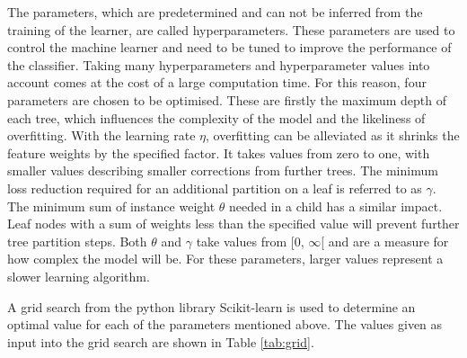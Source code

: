 The parameters, which are predetermined and can not be inferred from the training of the learner, are called hyperparameters. These parameters are used
to control the machine learner and need to be tuned to improve the performance of the classifier.
Taking many hyperparameters and hyperparameter values into account comes at the
cost of a large computation time. For this reason, four parameters are chosen to be optimised. These are firstly the maximum depth of each tree, which influences the
complexity of the model and the likeliness of overfitting. With the learning rate $\eta$, overfitting can be alleviated as it shrinks the feature weights
by the specified factor. It takes values from zero to one, with smaller values describing smaller corrections from further trees.
The minimum loss reduction required for an additional partition on a leaf is referred to as $\gamma$. The minimum sum of instance weight $\theta$
needed in a child has a similar impact. Leaf nodes with a sum of weights less than the specified value will prevent further tree partition steps.
Both $\theta$ and $\gamma$ take values from [0, $\infty$[ and are a measure for how complex the model will be.
For these parameters, larger values represent a slower learning algorithm.

A grid search from the python \cite{python} library Scikit-learn \cite{scikit} is used to determine an optimal
value for each of the parameters mentioned above. The values given as input into the grid search
are shown in Table \ref{tab:grid}.

